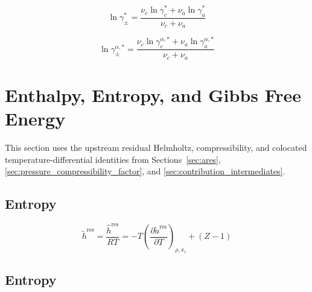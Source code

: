 \documentclass[12pt, letterpaper]{article}
\begin{document}
\begin{equation}
    \ln\gamma_{\pm}^{*}
    =
    \frac{\nu_{c}\ln\gamma_{c}^{*}+\nu_{a}\ln\gamma_{a}^{*}}{\nu_{c}+\nu_{a}}
    \label{eq:lngamma_pm_asym}
\end{equation}


\begin{equation}
    \ln\gamma_{\pm}^{\alpha,*}
    =
    \frac{\nu_{c}\ln\gamma_{c}^{\alpha,*}+\nu_{a}\ln\gamma_{a}^{\alpha,*}}{\nu_{c}+\nu_{a}}
    \label{eq:lngamma_pm_alpha_asym}
\end{equation}


\section{Enthalpy, Entropy, and Gibbs Free Energy}
\label{sec:thermo_derived_properties}

This section uses the upstream residual Helmholtz, compressibility, and colocated temperature-differential identities from Sections~\ref{sec:ares}, \ref{sec:pressure_compressibility_factor}, and \ref{sec:contribution_intermediates}.

\subsection{Entropy}


\begin{equation}
    \tilde{h}^{\mathrm{res}} = \frac{\hat{h}^{\mathrm{res}}}{RT}=-T\left(\frac{\partial\tilde{a}^{\mathrm{res}}}{\partial T}\right)_{\rho,x_{i}}+(Z-1)
    \label{eq:h_res}
\end{equation}

\subsection{Entropy}
\end{document}
